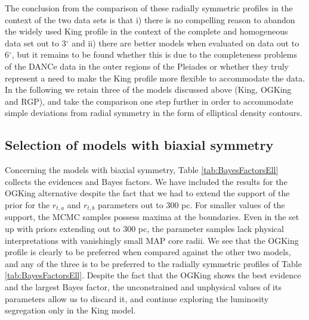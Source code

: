 The conclusion from the comparison of these radially symmetric profiles in the context of the two data sets is that i) there is no compelling reason to abandon the widely used King profile in the context of the complete and homogeneous data set out to 3$^{\circ}$ and ii) there are better models when evaluated on data out to 6$^{\circ}$, but it remains to be found whether this is due to the completeness problems of the DANCe data in the outer regions of the Pleiades or whether they truly represent a need to make the King profile more flexible to accommodate the data. In the following we retain three of the models discussed above (King, OGKing and RGP), and take the comparison one step further in order to accommodate simple deviations from radial symmetry in the form of elliptical density contours.

\subsection{Selection of models with biaxial symmetry}

Concerning the models with biaxial symmetry, Table \ref{tab:BayesFactorsEll} collects the evidences and Bayes factors. We have included the results for the OGKing alternative despite the fact that we had to extend the support of the prior for the $r_{t,a}$ and $r_{t,b}$ parameters out to 300 pc. For smaller values of the support, the MCMC samples possess maxima at the boundaries. Even in the set up with priors extending out to 300 pc, the parameter samples lack physical interpretations with vanishingly small MAP core radii. We see that the OGKing profile is clearly to be preferred when compared against the other two models, and any of the three is to be preferred to the radially symmetric profiles of Table \ref{tab:BayesFactorsEll}. Despite the fact that the OGKing shows the best evidence and the largest Bayes factor, the unconstrained and unphysical values of its parameters allow us to discard it, and continue exploring the luminosity segregation only in the King model.

